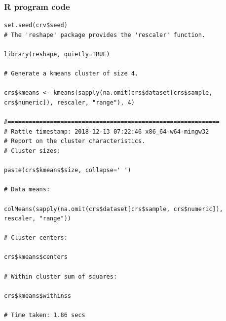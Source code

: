 \documentclass[a4paper]{article}
\begin{document}
\subsubsection{R program code}

\begin{verbatim}
set.seed(crv$seed)
# The 'reshape' package provides the 'rescaler' function.

library(reshape, quietly=TRUE)

# Generate a kmeans cluster of size 4.

crs$kmeans <- kmeans(sapply(na.omit(crs$dataset[crs$sample, crs$numeric]), rescaler, "range"), 4)

#============================================================
# Rattle timestamp: 2018-12-13 07:22:46 x86_64-w64-mingw32 
# Report on the cluster characteristics. 
# Cluster sizes:

paste(crs$kmeans$size, collapse=' ')

# Data means:

colMeans(sapply(na.omit(crs$dataset[crs$sample, crs$numeric]), rescaler, "range"))

# Cluster centers:

crs$kmeans$centers

# Within cluster sum of squares:

crs$kmeans$withinss

# Time taken: 1.86 secs
\end{verbatim}
\end{document}
